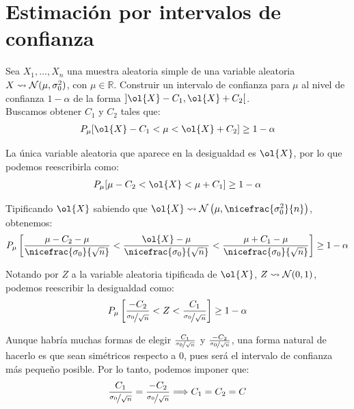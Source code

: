 \section{Estimación por intervalos de confianza}

\begin{ejemplo}
    Sea $X_1, \ldots, X_n$ una muestra aleatoria simple de una variable aleatoria $X \rightsquigarrow \mathcal{N}(\mu, \sigma^2_0)$, con $\mu \in \mathbb{R}$. Construir un intervalo de confianza para $\mu$ al nivel de confianza $1 - \alpha$ de la forma $\left]\ol{X} - C_1, \ol{X} + C_2\right[$.\\

    Buscamos obtener $C_1$ y $C_2$ tales que:
    \begin{align*}
        P_\mu[\ol{X} - C_1 < \mu < \ol{X} + C_2] \geq 1 - \alpha
    \end{align*}

    La única variable aleatoria que aparece en la desigualdad es $\ol{X}$, por lo que podemos reescribirla como:
    \begin{align*}
        P_\mu[\mu - C_2 < \ol{X} < \mu + C_1] \geq 1 - \alpha
    \end{align*}

    Tipificando $\ol{X}$ sabiendo que $\ol{X} \rightsquigarrow \cc{N}\left(\mu, \nicefrac{\sigma^2_0}{n}\right)$, obtenemos:
    \begin{align*}
        P_\mu\left[\frac{\mu - C_2 - \mu}{\nicefrac{\sigma_0}{\sqrt{n}}} < \frac{\ol{X} - \mu}{\nicefrac{\sigma_0}{\sqrt{n}}} < \frac{\mu + C_1 - \mu}{\nicefrac{\sigma_0}{\sqrt{n}}}\right] \geq 1 - \alpha
    \end{align*}

    Notando por $Z$ a la variable aleatoria tipificada de $\ol{X}$, $Z \rightsquigarrow \mathcal{N}(0, 1)$, podemos reescribir la desigualdad como:
    \begin{align*}
        P_\mu\left[\frac{- C_2}{\nicefrac{\sigma_0}{\sqrt{n}}} < Z < \frac{C_1}{\nicefrac{\sigma_0}{\sqrt{n}}}\right] \geq 1 - \alpha
    \end{align*}

    Aunque habría muchas formas de elegir $\frac{C_1}{\nicefrac{\sigma_0}{\sqrt{n}}}$ y $\frac{- C_2}{\nicefrac{\sigma_0}{\sqrt{n}}}$, una forma natural de hacerlo es que sean simétricos respecto a $0$, pues será el intervalo de confianza más pequeño posible. Por lo tanto, podemos imponer que:
    \begin{align*}
        \frac{C_1}{\nicefrac{\sigma_0}{\sqrt{n}}} = \frac{- C_2}{\nicefrac{\sigma_0}{\sqrt{n}}} \Longrightarrow C_1 = C_2 = C
    \end{align*}


\end{ejemplo}
